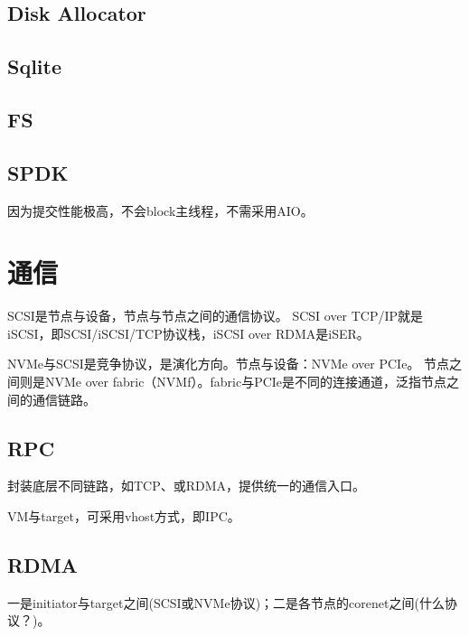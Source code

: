 \subsection{Disk Allocator}

\subsection{Sqlite}

\subsection{FS}

\subsection{SPDK}

因为提交性能极高，不会block主线程，不需采用AIO。

\section{通信}

SCSI是节点与设备，节点与节点之间的通信协议。
SCSI over TCP/IP就是iSCSI，即SCSI/iSCSI/TCP协议栈，iSCSI over RDMA是iSER。

NVMe与SCSI是竞争协议，是演化方向。节点与设备：NVMe over PCIe。
节点之间则是NVMe over fabric（NVMf）。fabric与PCIe是不同的连接通道，泛指节点之间的通信链路。

\subsection{RPC}

封装底层不同链路，如TCP、或RDMA，提供统一的通信入口。

VM与target，可采用vhost方式，即IPC。

\subsection{RDMA}

一是initiator与target之间(SCSI或NVMe协议)；二是各节点的corenet之间(什么协议？)。
